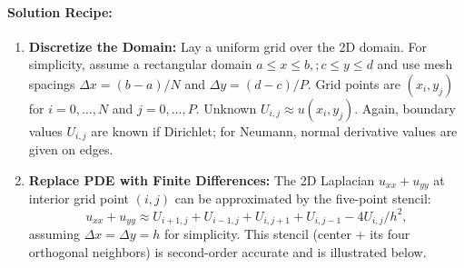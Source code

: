 \documentclass[a4paper,11pt]{article}
\begin{document}
\paragraph{Solution Recipe:}
\begin{enumerate}
    \item \textbf{Discretize the Domain:} Lay a uniform grid over the 2D domain. For simplicity, assume a rectangular domain ${a \le x \le b,; c \le y \le d}$ and use mesh spacings $\Delta x = (b-a)/N$ and $\Delta y = (d-c)/P$. Grid points are $(x_i, y_j)$ for $i=0,\dots,N$ and $j=0,\dots,P$. Unknown $U_{i,j} \approx u(x_i,y_j)$. Again, boundary values $U_{i,j}$ are known if Dirichlet; for Neumann, normal derivative values are given on edges.
    \item \textbf{Replace PDE with Finite Differences:} The 2D Laplacian $u_{xx}+u_{yy}$ at interior grid point $(i,j)$ can be approximated by the five-point stencil:
          $$
              u_{xx}+u_{yy}\approx U_{i+1,j}+U_{i-1,j}+U_{i,j+1}+U_{i,j-1}-4U_{i,j}/h^2,
          $$
          assuming $\Delta x = \Delta y = h$ for simplicity\cite{leifh}.
          This stencil (center + its four orthogonal neighbors) is second-order accurate and is illustrated below.
          \begin{figure}[H]
              \centering
\end{figure}
\end{enumerate}
\end{document}
